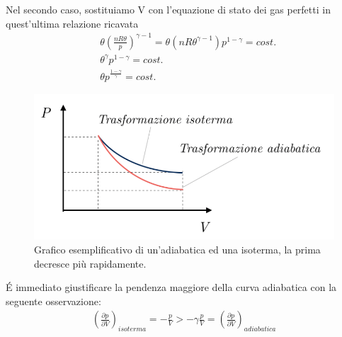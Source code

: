\documentclass[
10pt, %
a4paper, %
oneside, %
headinclude,footinclude, %
BCOR5mm, %
]{scrartcl}
\begin{document}
Nel secondo caso, sostituiamo V con l'equazione di stato dei gas perfetti in quest'ultima relazione ricavata
\begin{align}\label{eq:adiabatica3}
	&\theta \left(\frac{n R \theta}{p} \right)^{\gamma-1}= \theta (n R \theta^{\gamma-1}) p^{1-\gamma}= cost.\nonumber\\
	&\theta^{\gamma} p^{1-\gamma}= cost.\nonumber\\
	&\theta p^{\frac{1-\gamma}{\gamma}} = cost.
\end{align}
\begin{figure}[h!]
	\centering
	\includegraphics[width=0.6\linewidth]{../images/adiabatica_grafico}
	\caption{Grafico esemplificativo di un'adiabatica ed una isoterma, la prima decresce più rapidamente.}
	\label{fig:adiabaticagrafico}
\end{figure}
\FloatBarrier
\'{E} immediato giustificare la pendenza maggiore della curva adiabatica con la seguente osservazione:
\begin{align*}
	\left(\frac{\partial p}{\partial V}\right)_{isoterma} = -\frac{p}{V} > -\gamma \frac{p}{V} = \left(\frac{\partial p}{\partial V}\right)_{adiabatica}
\end{align*}
\end{document}
